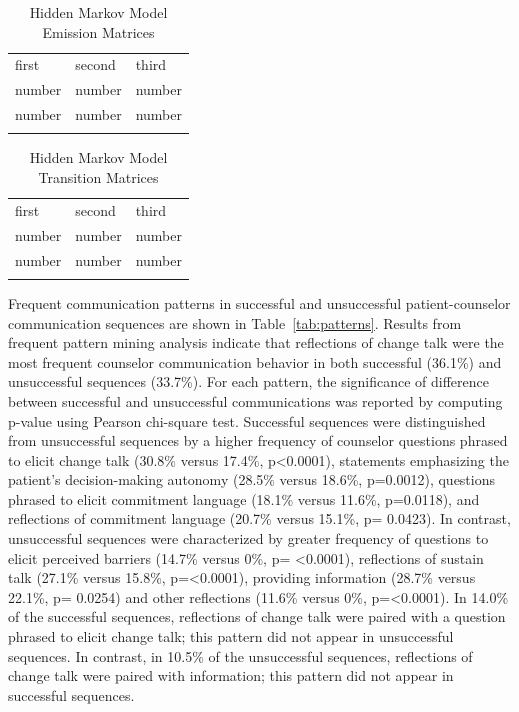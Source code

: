 \begin{landscape}
\begin{table}
\caption{Hidden Markov Model Emission Matrices}
\label{tab:emission}       %
\begin{tabular}{lll}
\hline\noalign{\smallskip}
first & second & third  \\
\noalign{\smallskip}\hline\noalign{\smallskip}
number & number & number \\
number & number & number \\
\noalign{\smallskip}\hline
\end{tabular}
\end{table}

\begin{table}
\caption{Hidden Markov Model Transition Matrices}
\label{tab:transition}       %
\begin{tabular}{lll}
\hline\noalign{\smallskip}
first & second & third  \\
\noalign{\smallskip}\hline\noalign{\smallskip}
number & number & number \\
number & number & number \\
\noalign{\smallskip}\hline
\end{tabular}
\end{table}

\end{landscape}
\restoregeometry


Frequent communication patterns in successful and unsuccessful patient-counselor communication sequences are shown in Table~\ref{tab:patterns}. Results from frequent pattern mining analysis indicate that reflections of change talk were the most frequent counselor communication behavior in both successful (36.1\%) and unsuccessful sequences (33.7\%). For each pattern, the significance of difference between successful and unsuccessful communications was reported by computing p-value using Pearson chi-square test. Successful sequences were distinguished from unsuccessful sequences by a higher frequency of counselor questions phrased to elicit change talk (30.8\% versus 17.4\%, p<0.0001), statements emphasizing the patient’s decision-making autonomy (28.5\% versus 18.6\%, p=0.0012), questions phrased to elicit commitment language (18.1\% versus 11.6\%, p=0.0118), and reflections of commitment language (20.7\% versus 15.1\%, p= 0.0423). In contrast, unsuccessful sequences were characterized by greater frequency of questions to elicit perceived barriers (14.7\% versus 0\%, p= <0.0001), reflections of sustain talk (27.1\% versus 15.8\%, p=<0.0001), providing information (28.7\% versus 22.1\%, p= 0.0254) and other reflections (11.6\% versus 0\%, p=<0.0001). In 14.0\% of the successful sequences, reflections of change talk were paired with a question phrased to elicit change talk; this pattern did not appear in unsuccessful sequences. In contrast, in 10.5\% of the unsuccessful sequences, reflections of change talk were paired with information; this pattern did not appear in successful sequences.

